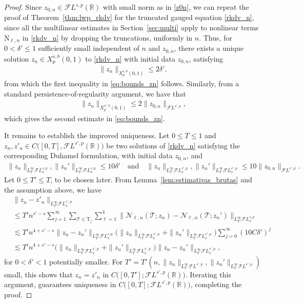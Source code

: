 \documentclass[a4paper,
11pt,  reqno]{amsart}
\newcommand{\5}{\textup{V}}
\newcommand{\FL}{\mathcal{F} L}
\newcommand{\les}{\lesssim}
\newcommand{\dl}{\delta}
\theoremstyle{remark}
\newcommand{\R}{\mathbb{R}}
\newcommand{\TT}{\mathcal{T}}
\newcommand{\Tr}{\mathrm{T}}
\renewcommand{\l}{\ell}
\numberwithin{equation}{section}
\numberwithin{theorem}{section}
\newcommand{\NN}{\mathrm{N}}
\newcommand{\Ncal}{\mathcal{N}}
\begin{document}
\begin{proof}

Since $z_{0,n} \in \FL^{s,p}(\R)$ with small norm as in \eqref{z0n}, we can repeat the proof of Theorem~\ref{thm:lwp_rkdv} for the truncated gauged equation \eqref{rkdv_n}, since all the multilinear estimates in Section~\ref{sec:multi} apply to nonlinear terms $\NN_{\l, n}$ in \eqref{rkdv_n} by dropping the truncations, uniformly in $n$. Thus, for $0 < \dl' \le 1$ sufficiently small independent of $n$ and $z_{0,n}$, there exists a unique solution $z_n \in X^{s, b}_p(0,1)$ to \eqref{rkdv_n} with initial data $z_{0,n}$, satisfying
\begin{align}
\| z_n \|_{X^{s,b}_p(0,1)} \le 2 \dl ',
\end{align}
from which the first inequality in \eqref{eq:bounds_zn} follows. Similarly, from a standard persistence-of-regularity argument, we have that
\begin{align*}
\| z_n \|_{X^{s',b}_p (0,1)} \le 2 \| z_{0,n} \|_{\FL^{s',p}},
\end{align*}
which gives the second estimate in  \eqref{eq:bounds_zn}.

\smallskip

It remains to establish the improved uniqueness. Let $0\le T\le 1$ and $z_n,z'_n\in C\big([0,T], \FL^{s',p}(\R)\big)$ be two solutions of \eqref{rkdv_n} satisfying the corresponding Duhamel formulation, with initial data $z_{0,n}$, and
\begin{align*}
\| z_n \|_{L^\infty_T \FL^{s,p}_x} , \| z_n' \|_{L^\infty_T  \FL^{s,p}_x} \le 10 \dl'
\quad
\text{and}
\quad
\| z_n \|_{L^\infty_T \FL^{s',p}_x} , \| z_n' \|_{L^\infty_T  \FL^{s',p}_x} \le 10 \| z_{0,n} \|_{\FL^{s',p}}.
\end{align*}
Let $0\le T'\le T $, to be chosen later. From Lemma~\ref{lem:estimativas_brutas} and the assumption above, we have
	\begin{align*}
&
\|z_n-z'_n\|_{L^\infty_{T'}\FL^{s',p}_x}
\\
&
\le
T' n^{s'-s} \sum_{j=1}^\infty \sum_{\TT \in \Tr_j} \sum_{\l=1}^4 \big\| \Ncal_{\l, n}(\TT; z_n) - \Ncal_{\l, n} (\TT; z_n') \big\|_{L^\infty_{T'} \FL^{s,p}_x}
\\
&
\les T' n^{4 + s'-s} \|z_n - z_n' \|_{L^\infty_{T'} \FL^{s,p}_x}
\big(
\| z_n \|_{L^\infty_T  \FL^{s',p}_x}
+
\| z_n' \|_{L^\infty_T  \FL^{s',p}_x}
\big)
\sum_{j=0}^\infty (10 C \dl')^j
\\&\les T' n^{4+s'-s}\big(
\| z_n \|_{L^\infty_T  \FL^{s',p}_x}
+
\| z_n' \|_{L^\infty_T  \FL^{s',p}_x}
\big)
 \|z_n - z_n' \|_{L^\infty_T \FL^{s',p}_x}
,
	\end{align*}
for $0<\dl'<1 $ potentially smaller.
For $T'  = T'(n, \|z_{n}\|_{L^\infty_T \FL^{s',p}}, \|z_{n}'\|_{L^\infty_T \FL^{s',p}}) $ small, this shows that $z_n=z'_n$ in $C\big([0,T']; \FL^{s',p}(\R) \big)$. Iterating this argument, guarantees uniqueness in $C\big([0,T] ; \FL^{s',p}(\R)\big)$, completing the proof. \qedhere

\end{proof}
\end{document}
